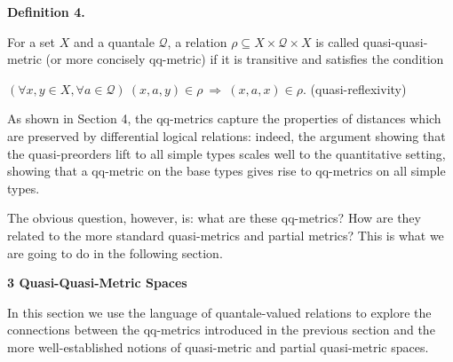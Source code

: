\documentclass[10pt,a4paper]{amsart}
\begin{document}
 
 
\par\medskip\noindent\textbf{Definition 4.}\par
 
 
For a set $X$ and a quantale $\mathcal{Q}$, a relation $\rho\subseteq X\times\mathcal{Q}\times X$ is called quasi-quasi-metric (or more concisely qq-metric) if it is transitive and satisfies the condition\par
    $\displaystyle(\forall x,y\in X,\forall a\in\mathcal{Q})\ (x,a,y)\in\rho\ %
\Rightarrow\ (x,a,x)\in\rho.$  (quasi-reflexivity)   
 
 
 
As shown in Section 4, the qq-metrics capture the properties of distances which are preserved by differential logical relations: indeed, the argument showing that the quasi-preorders lift to all simple types scales well to the quantitative setting, showing that a qq-metric on the base types gives rise to qq-metrics on all simple types.\par
 
 
 
The obvious question, however, is: what are these qq-metrics? How are they related to the more standard quasi-metrics and partial metrics? This is what we are going to do in the following section.\par
 
 
 


 
\par\medskip\noindent\textbf{3 Quasi-Quasi-Metric Spaces}\par
 
 
In this section we use the language of quantale-valued relations to explore the connections between the qq-metrics introduced in the previous section and the more well-established notions of quasi-metric and partial quasi-metric spaces.\par
 
\end{document}
